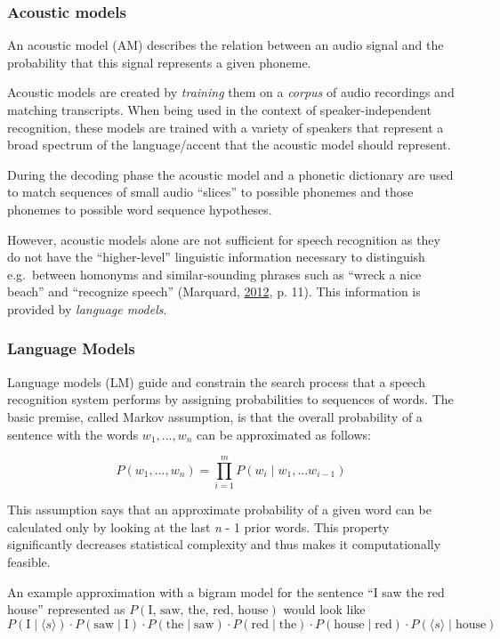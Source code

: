 \documentclass[]{article}
\begin{document}
\subsubsection{Acoustic models}\label{acoustic-models}

An acoustic model (AM) describes the relation between an audio signal
and the probability that this signal represents a given phoneme.

Acoustic models are created by \emph{training} them on a \emph{corpus}
of audio recordings and matching transcripts. When being used in the
context of speaker-independent recognition, these models are trained
with a variety of speakers that represent a broad spectrum of the
language/accent that the acoustic model should represent.

During the decoding phase the acoustic model and a phonetic dictionary
are used to match sequences of small audio ``slices'' to possible
phonemes and those phonemes to possible word sequence hypotheses.

However, acoustic models alone are not sufficient for speech recognition
as they do not have the ``higher-level'' linguistic information
necessary to distinguish e.g.~between homonyms and similar-sounding
phrases such as ``wreck a nice beach'' and ``recognize speech''
(Marquard, \hyperref[ref-marquard]{2012}, p. 11). This information is
provided by \emph{language models}.

\subsubsection{Language Models}\label{language-models}

Language models (LM) guide and constrain the search process that a
speech recognition system performs by assigning probabilities to
sequences of words. The basic premise, called Markov assumption, is that
the overall probability of a sentence with the words \(w_1,...,w_n\) can
be approximated as follows:

\[P(w_1,...,w_n) = \prod_{i=1}^m P(w_i \mid w_1,...w_{i-1})\]

This assumption says that an approximate probability of a given word can
be calculated only by looking at the last \emph{n} - 1 prior words. This
property significantly decreases statistical complexity and thus makes
it computationally feasible.

An example approximation with a bigram model for the sentence ``I saw
the red house'' represented as \(P(\text{I, saw, the, red, house})\)
would look like \[
  P(\text{I} \mid \langle s \rangle) \cdot
  P(\text{saw} \mid \text{I}) \cdot
  P(\text{the} \mid \text{saw}) \cdot
  P(\text{red} \mid \text{the}) \cdot
  P(\text{house} \mid \text{red}) \cdot
  P(\langle s \rangle \mid \text{house})
\]
\end{document}
